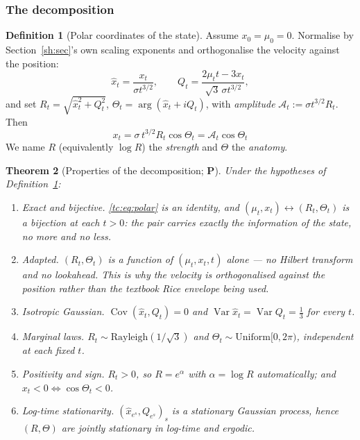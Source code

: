 \documentclass[11pt]{article}
\numberwithin{equation}{section}
\theoremstyle{plain}
\newtheorem{theorem}{Theorem}[section]
\theoremstyle{definition}
\newtheorem{definition}[theorem]{Definition}
\theoremstyle{remark}
\DeclareMathOperator{\Var}{Var}
\DeclareMathOperator{\Cov}{Cov}
\newcommand{\Ac}{\mathcal{A}}
\begin{document}
\subsubsection{The decomposition}\label{tc:subsub:polar}

\begin{definition}[Polar coordinates of the state]\label{tc:def:polar}
Assume $x_0=\mu_0=0$. Normalise by Section~\ref{sh:sec}'s own scaling exponents
and orthogonalise the velocity against the position:
\begin{equation}\label{tc:eq:polarcoords}
\hat x_t=\frac{x_t}{\sigma t^{3/2}},
\qquad
Q_t=\frac{2\mu_t t-3x_t}{\sqrt3\,\sigma t^{3/2}},
\end{equation}
and set $R_t=\sqrt{\hat x_t^{2}+Q_t^{2}}$,
$\Theta_t=\arg(\hat x_t+iQ_t)$, with \emph{amplitude}
$\Ac_t:=\sigma t^{3/2}R_t$. Then
\begin{equation}\label{tc:eq:polar}
\boxed{\;x_t=\sigma\,t^{3/2}R_t\cos\Theta_t=\Ac_t\cos\Theta_t\;}
\end{equation}
We name $R$ (equivalently $\log R$) the \emph{strength} and $\Theta$ the
\emph{anatomy}.
\end{definition}

\begin{theorem}[Properties of the decomposition; \textbf{P}]
\label{tc:thm:polar}
Under the hypotheses of Definition~\ref{tc:def:polar}:
\begin{enumerate}[label=\emph{(\roman*)},itemsep=1pt]
\item \emph{Exact and bijective.} \eqref{tc:eq:polar} is an identity,
and $(\mu_t,x_t)\leftrightarrow(R_t,\Theta_t)$ is a bijection at each
$t>0$: the pair carries exactly the information of the state, no more
and no less.
\item \emph{Adapted.} $(R_t,\Theta_t)$ is a function of
$(\mu_t,x_t,t)$ alone --- no Hilbert transform and no lookahead. This is
why the velocity is orthogonalised against the position rather than the
textbook Rice envelope \cite{Ric44,Ric45,CL67} being used.
\item \emph{Isotropic Gaussian.} $\Cov(\hat x_t,Q_t)=0$ and
$\Var\hat x_t=\Var Q_t=\tfrac13$ for every $t$.
\item \emph{Marginal laws.} $R_t\sim\mathrm{Rayleigh}(1/\sqrt3)$ and
$\Theta_t\sim\mathrm{Uniform}[0,2\pi)$, independent at each fixed $t$.
\item \emph{Positivity and sign.} $R_t>0$, so $R=e^{\alpha}$ with
$\alpha=\log R$ automatically; and $x_t<0\iff\cos\Theta_t<0$.
\item \emph{Log-time stationarity.} $(\hat x_{e^{s}},Q_{e^{s}})_{s}$ is
a stationary Gaussian process, hence $(R,\Theta)$ are jointly stationary
in log-time and ergodic.
\end{enumerate}
\end{theorem}
\end{document}
